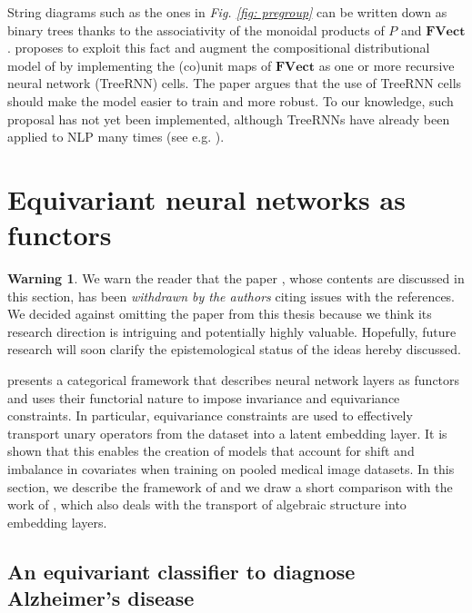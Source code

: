 \documentclass[11pt,a4paper,openright,twoside]{report}
\newcounter{mycounter}
\theoremstyle{plain}
\theoremstyle{definition}
\newtheorem{warning}[mycounter]{Warning}
\begin{document}
String diagrams such as the ones in \textit{Fig. \ref{fig: pregroup}} can be written down as binary trees thanks to the associativity of the monoidal products of $P$ and $\mathbf{FVect}$. 
\cite{lewis2019compositionality} proposes to exploit this fact and augment the compositional distributional model of \cite{coecke2010mathematical} by implementing the (co)unit maps of $\mathbf{FVect}$ as one or more recursive neural network (TreeRNN) cells. The paper argues that the use of TreeRNN cells should make the model easier to train and more robust. To our knowledge, such proposal has not yet been implemented, although TreeRNNs have already been applied to NLP many times (see e.g. \cite{ahmed2019improving}).

\section{Equivariant neural networks as functors}

\begin{warning}
  We warn the reader that the paper \cite{chytas2024poolingimagedatasetsmultiple}, whose contents are discussed in this section, has been \textit{withdrawn by the authors} citing issues with the references. We decided against omitting the paper from this thesis because we think its research direction is intriguing and potentially highly valuable. Hopefully, future research will soon clarify the epistemological status of the ideas hereby discussed.
\end{warning}

\cite{chytas2024poolingimagedatasetsmultiple} presents a categorical framework that describes neural network layers as functors and uses their functorial nature to impose invariance and equivariance constraints. In particular, equivariance constraints are used to effectively transport unary operators from the dataset into a latent embedding layer. It is shown that this enables the creation of models that account for shift and imbalance in covariates when training on pooled medical image datasets. In this section, we describe the framework of \cite{chytas2024poolingimagedatasetsmultiple} and we draw a short comparison with the work of \cite{pfrommer2024transport}, which also deals with the transport of algebraic structure into embedding layers.


\subsection{An equivariant classifier to diagnose Alzheimer's disease}
\end{document}
